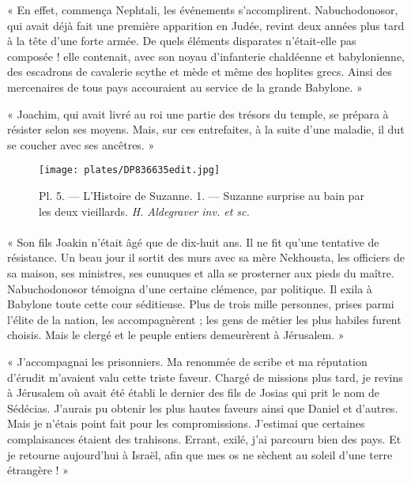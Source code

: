 \documentclass[a4paper, 11pt, oneside, polutonikogreek, french]{article}
\begin{document}
\bigskip
\centerline{\EightStarTaper}
\centerline{\EightStarTaper\EightStarTaper}
\bigskip

« En effet, commença Nephtali, les événements s'accomplirent. Nabuchodonosor, qui avait déjà fait une première apparition en Judée, revint deux années plus tard à la tête d'une forte armée. De quels éléments disparates n'était-elle pas composée ! elle contenait, avec son noyau d'infanterie chaldéenne et babylonienne, des escadrons de cavalerie scythe et mède et même des hoplites grecs. Ainsi des mercenaires de tous pays accouraient au service de la grande Babylone. »

« Joachim, qui avait livré au roi une partie des trésors du temple, se prépara à résister selon ses moyens. Mais, sur ces entrefaites, à la suite d'une maladie, il dut se coucher avec ses ancêtres. »
\clearpage
\vspace*{\fill}
\begin{figure}[H]
\centering
\texttt{[image: plates/DP836635edit.jpg]}
\caption{Pl. 5. --- L'Histoire de Suzanne. 1. --- Suzanne surprise au bain par les deux vieillards. \emph{H. Aldegraver inv. et sc.}}
\end{figure}
\vspace*{\fill}
\clearpage
\paragraph{}
« Son fils Joakin n'était âgé que de dix-huit ans. Il ne fit qu'une tentative de résistance. Un beau jour il sortit des murs avec sa mère Nekhousta, les officiers de sa maison, ses ministres, ses eunuques et alla se prosterner aux pieds du maître. Nabuchodonosor témoigna d'une certaine clémence, par politique. Il exila à Babylone toute cette cour séditieuse. Plus de trois mille personnes, prises parmi l'élite de la nation, les accompagnèrent ; les gens de métier les plus habiles furent choisis. Mais le clergé et le peuple entiers demeurèrent à Jérusalem. »

« J'accompagnai les prisonniers. Ma renommée de scribe et ma réputation d'érudit m'avaient valu cette triste faveur. Chargé de missions plus tard, je revins à Jérusalem où avait été établi le dernier des fils de Josias qui prit le nom de Sédécias. J'aurais pu obtenir les plus hautes faveurs ainsi que Daniel et d'autres. Mais je n'étais point fait pour les compromissions. J'estimai que certaines complaisances étaient des trahisons. Errant, exilé, j'ai parcouru bien des pays. Et je retourne aujourd'hui à Israël, afin que mes os ne sèchent au soleil d'une terre étrangère ! »
\end{document}
